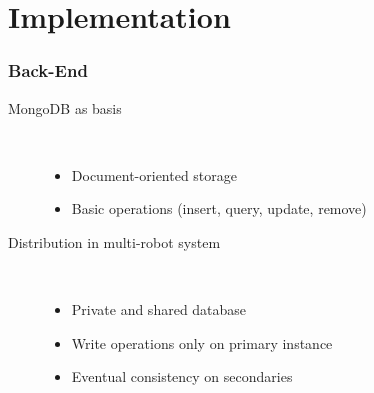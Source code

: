 \section{Implementation}
\begin{frame}
  \frametitle{Back-End}
  \begin{description}
  \item[MongoDB as basis]%
                \hfill \\
    \begin{itemize}
    \item Document-oriented storage
    \item Basic operations (insert, query, update, remove)
    \end{itemize}
  \item[Distribution in multi-robot system]%
                \hfill \\
    \begin{itemize}
    \item Private and shared database
    \item Write operations only on primary instance
    \item Eventual consistency on secondaries %
    \end{itemize}
  \end{description}
\end{frame}

